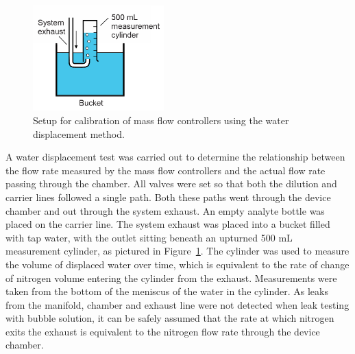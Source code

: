 \documentclass[
  a4paper,
]{scrbook}
\begin{document}
\begin{figure}

{\centering \includegraphics[width=0.45\textwidth,height=\textheight]{figures/ch5/water_displacement.png}

}

\caption{\label{fig-water-displacement}Setup for calibration of mass
flow controllers using the water displacement method.}

\end{figure}

A water displacement test was carried out to determine the relationship
between the flow rate measured by the mass flow controllers and the
actual flow rate passing through the chamber. All valves were set so
that both the dilution and carrier lines followed a single path. Both
these paths went through the device chamber and out through the system
exhaust. An empty analyte bottle was placed on the carrier line. The
system exhaust was placed into a bucket filled with tap water, with the
outlet sitting beneath an upturned 500 mL measurement cylinder, as
pictured in Figure~\ref{fig-water-displacement}. The cylinder was used
to measure the volume of displaced water over time, which is equivalent
to the rate of change of nitrogen volume entering the cylinder from the
exhaust. Measurements were taken from the bottom of the meniscus of the
water in the cylinder. As leaks from the manifold, chamber and exhaust
line were not detected when leak testing with bubble solution, it can be
safely assumed that the rate at which nitrogen exits the exhaust is
equivalent to the nitrogen flow rate through the device chamber.
\end{document}
